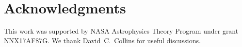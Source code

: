 \section*{Acknowledgments}

This work was supported by NASA Astrophysics Theory Program under grant NNX17AF87G.  We thank David~C.~Collins for useful discussions.  
